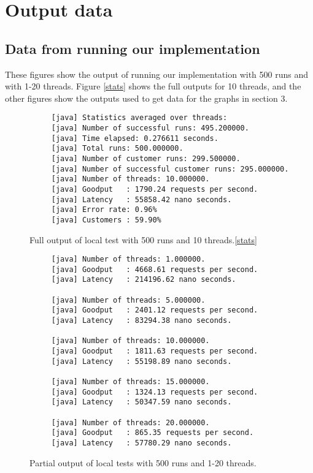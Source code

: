 \chapter{Output data}
\section{Data from running our implementation}
These figures show the output of running our implementation with 500 runs and with 1-20 threads. Figure \ref{stats} shows the full outputs for 10 threads, and the other figures show the outputs used to get data for the graphs in section 3.

\begin{figure}[h!]
\begin{verbatim}
     [java] Statistics averaged over threads:
     [java] Number of successful runs: 495.200000.
     [java] Time elapsed: 0.276611 seconds.
     [java] Total runs: 500.000000.
     [java] Number of customer runs: 299.500000.
     [java] Number of successful customer runs: 295.000000.
     [java] Number of threads: 10.000000.
     [java] Goodput   : 1790.24 requests per second.
     [java] Latency   : 55858.42 nano seconds.
     [java] Error rate: 0.96%
     [java] Customers : 59.90%
\end{verbatim}
\caption{Full output of local test with 500 runs and 10 threads.\ref{stats}}
\end{figure}

\begin{figure}[h!]
\begin{verbatim}
     [java] Number of threads: 1.000000.
     [java] Goodput   : 4668.61 requests per second.
     [java] Latency   : 214196.62 nano seconds.

     [java] Number of threads: 5.000000.
     [java] Goodput   : 2401.12 requests per second.
     [java] Latency   : 83294.38 nano seconds.

     [java] Number of threads: 10.000000.
     [java] Goodput   : 1811.63 requests per second.
     [java] Latency   : 55198.89 nano seconds.

     [java] Number of threads: 15.000000.
     [java] Goodput   : 1324.13 requests per second.
     [java] Latency   : 50347.59 nano seconds.

     [java] Number of threads: 20.000000.
     [java] Goodput   : 865.35 requests per second.
     [java] Latency   : 57780.29 nano seconds.
\end{verbatim}
\caption{Partial output of local tests with 500 runs and 1-20 threads.}
\end{figure}

